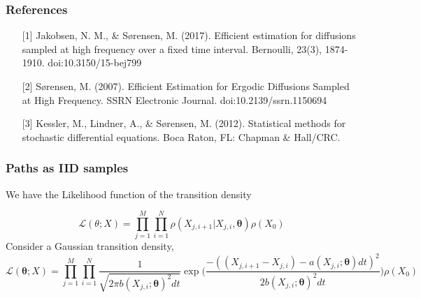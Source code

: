 \documentclass[aspectratio=169]{beamer}\usepackage[utf8]{inputenc}
\begin{document}
{

%
%


\begin{frame}\frametitle{References}
\begin{itemize}
\item[][1] Jakobsen, N. M., \& Sørensen, M. (2017). Efficient estimation for diffusions sampled at high frequency over a fixed time interval. Bernoulli, 23(3), 1874-1910. doi:10.3150/15-bej799
\item[][2] Sørensen, M. (2007). Efficient Estimation for Ergodic Diffusions Sampled at High Frequency. SSRN Electronic Journal. doi:10.2139/ssrn.1150694
\item[][3] Kessler, M., Lindner, A., \& Sørensen, M. (2012). Statistical methods for stochastic differential equations. Boca Raton, FL: Chapman \& Hall/CRC.
\end{itemize}

\end{frame}


\begin{frame}\frametitle{ Paths as IID samples  }

We have the Likelihood function of the transition density

\begin{equation}
\mathcal{L}(\theta;X) = \prod\limits_{j=1}^M\prod\limits_{i=1}^N\rho( {X_{j,i+1}|X_{j,i}}, \bm{\theta})  \rho(X_0) 
\end{equation}
Consider a Gaussian transition density,
\begin{equation*}
\mathcal{L}(\bm{\theta}; X) = \prod\limits_{j=1}^M \prod\limits_{i=1}^N  \frac{1}{\sqrt{2 \pi b(X_{j,i};\bm{\theta})^2 dt}  } \exp\Big(\frac{-((X_{j,i+1}-X_{j,i}) - a(X_{j,i};\bm{\theta}) dt )^2}{2b(X_{j,i};\bm{\theta})^2 dt}\Big) \rho(X_0)
\end{equation*}


\end{frame}}
\end{document}
